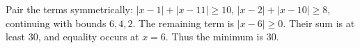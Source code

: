 Pair the terms symmetrically: $|x-1|+|x-11|\ge10$, $|x-2|+|x-10|\ge8$, continuing with bounds $6,4,2$. The remaining term is $|x-6|\ge0$. Their sum is at least $30$, and equality occurs at $x=6$. Thus the minimum is $\boxed{30}$.
